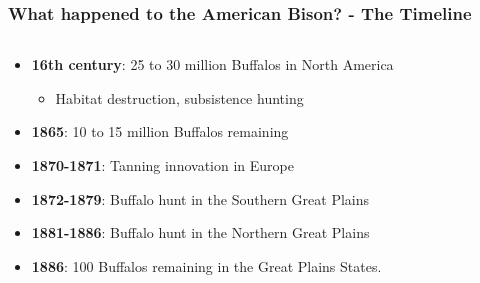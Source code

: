 \documentclass[aspectratio=169, 12pt, final]{beamer}
\begin{document}
\begin{frame}
\frametitle{What happened to the American Bison? - The Timeline}
\begin{columns}
\begin{column}{0.7\textwidth}
\footnotesize{
\begin{itemize}
	\item \textbf{16th century}: 25 to 30 million Buffalos in North America
	\begin{itemize}
		\item Habitat destruction, subsistence hunting %
	\end{itemize}
	\item \textbf{1865}: 10 to 15 million Buffalos remaining
	\pause
	\item \textbf{1870-1871}: Tanning innovation in Europe %
	\item \textbf{1872-1879}: Buffalo hunt in the Southern Great Plains
	\item \textbf{1881-1886}: Buffalo hunt in the Northern Great Plains 
	\item \textbf{1886}: 100 Buffalos remaining in the Great Plains States.
\end{itemize}	
}
\end{column}
\begin{column}{0.3\textwidth}

\end{column}
\end{columns}
\end{frame}
\end{document}
